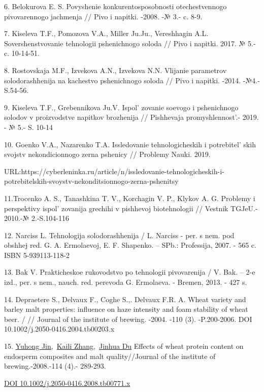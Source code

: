 6. Belokurova E. S. Povyshenie konkurentosposobnosti otechestvennogo
pivovarennogo jachmenja // Pivo i napitki. -2008. -№ 3.- c. 8-9.

7. Kiseleva T.F., Pomozova V.A., Miller Ju.Ju., Vereshhagin A.L.
Sovershenstvovanie tehnologii pshenichnogo soloda // Pivo i napitki.
2017. № 5.- c. 10-14-51.

8. Rostovskaja M.F., Izvekova A.N., Izvekova N.N. Vlijanie parametrov
solodorashhenija na kachestvo pshenichnogo soloda // Pivo i napitki.
-2014. -№4.- S.54-56.

9. Kiseleva T.F., Grebennikova Ju.V. Ispol' zovanie
soevogo i pshenichnogo solodov v proizvodstve napitkov brozhenija //
Pishhevaja promyshlennost'.- 2019. - № 5.- S. 10-14

10. Goenko V.A., Nazarenko T.A. Issledovanie tehnologicheskih i
potrebitel' skih svojstv nekondicionnogo zerna pshenicy
// Problemy Nauki. 2019.

URL:https://cyberleninka.ru/article/n/issledovanie-tehnologicheskih-i-potrebitelskih-svoystv-nekonditsionnogo-zerna-pshenitsy

11.Trocenko A. S., Tanashkina T. V., Korchagin V. P., Klykov A. G.
Problemy i perspektivy ispol' zovanija grechihi v
pishhevoj biotehnologii // Vestnik TGJeU.- 2010.-№ 2.-S.104-116

12. Narciss L. Tehnologija solodorashhenija / L. Narciss - per. s nem.
pod obshhej red. G. A. Ermolaevoj, E. F. Shapenko. -- SPb.: Professija,
2007. - 565 c. ISBN 5-939113-118-2

13. Bak V. Prakticheskoe rukovodstvo po tehnologii pivovarenija / V.
Bak. -- 2-e izd., per. s nem., nauch. red. perevoda G. Ermolaeva. -
Bremen, 2013. - 427 s.

14. Depraetere S., Delvaux F., Coghe S.,. Delvaux F.R. A. Wheat variety
and barley malt properties: influence on haze intensity and foam
stability of wheat beer. / // Journal of the institute of brewing.
-2004. -110 (3). -P.200-2006. DOI 10.1002/j.2050-0416.2004.tb00203.x

15. \href{https://onlinelibrary.wiley.com/authored-by/Jin/Yuhong}{Yuhong
Jin},~\href{https://onlinelibrary.wiley.com/authored-by/Zhang/Kaili}{Kaili
Zhang},~\href{https://onlinelibrary.wiley.com/authored-by/Du/Jinhua}{Jinhua
Du} Effects of wheat protein content on endosperm composites and malt
quality//Journal of the institute of brewing.-2008.-114 (4).- 289-293.

\href{https://doi.org/10.1002/j.2050-0416.2008.tb00771.x}{DOI
10.1002/j.2050-0416.2008.tb00771.x}

